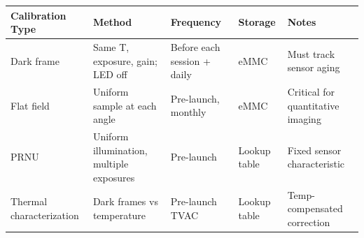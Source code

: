 \begin{longtable}{L{3.8cm}L{3.8cm}L{2.5cm}L{2.5cm}L{3cm}}
\toprule
\textbf{Calibration Type} & \textbf{Method} & \textbf{Frequency} & \textbf{Storage} & \textbf{Notes} \\
\midrule
Dark frame & Same T, exposure, gain; LED off & Before each session + daily & eMMC & Must track sensor aging \\
Flat field & Uniform sample at each angle & Pre-launch, monthly & eMMC & Critical for quantitative imaging \\
PRNU & Uniform illumination, multiple exposures & Pre-launch & Lookup table & Fixed sensor characteristic \\
Thermal characterization & Dark frames vs temperature & Pre-launch TVAC & Lookup table & Temp-compensated correction \\
\bottomrule
\end{longtable}
